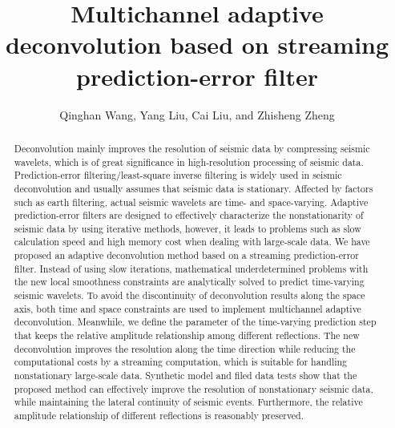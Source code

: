 
\title{Multichannel adaptive deconvolution based on streaming
  prediction-error filter}

\renewcommand{\thefootnote}{\fnsymbol{footnote}}
{}
             
\address{
College of Geo-exploration Science and Technology,\\
Jilin University \\
No.938 Xi minzhu street \\
Changchun, China, 130026}

\author{Qinghan Wang, Yang Liu, Cai Liu, and Zhisheng Zheng}

\maketitle

\begin{abstract}
  Deconvolution mainly improves the resolution of seismic data by
  compressing seismic wavelets, which is of great significance in
  high-resolution processing of seismic data. Prediction-error
  filtering/least-square inverse filtering is widely used in seismic
  deconvolution and usually assumes that seismic data is
  stationary. Affected by factors such as earth filtering, actual
  seismic wavelets are time- and space-varying. Adaptive
  prediction-error filters are designed to effectively characterize
  the nonstationarity of seismic data by using iterative methods,
  however, it leads to problems such as slow calculation speed and
  high memory cost when dealing with large-scale data. We have
  proposed an adaptive deconvolution method based on a streaming
  prediction-error filter. Instead of using slow iterations,
  mathematical underdetermined problems with the new local smoothness
  constraints are analytically solved to predict time-varying seismic
  wavelets. To avoid the discontinuity of deconvolution results along
  the space axis, both time and space constraints are used to
  implement multichannel adaptive deconvolution. Meanwhile, we define
  the parameter of the time-varying prediction step that keeps the
  relative amplitude relationship among different reflections. The new
  deconvolution improves the resolution along the time direction while
  reducing the computational costs by a streaming computation, which
  is suitable for handling nonstationary large-scale data. Synthetic
  model and filed data tests show that the proposed method can
  effectively improve the resolution of nonstationary seismic data,
  while maintaining the lateral continuity of seismic
  events. Furthermore, the relative amplitude relationship of
  different reflections is reasonably preserved.
\end{abstract}

